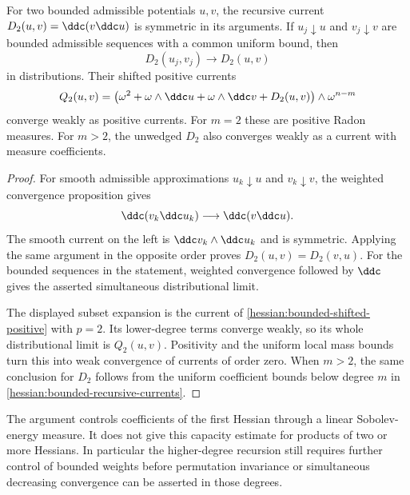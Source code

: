 \begin{theorem}\label{hessian:bounded-two-factor-convergence}
For two bounded admissible potentials $u,v$, the recursive current
$D_2(u,v)=\ddc(v\ddc u)$ is symmetric in its arguments. If
$u_j\downarrow u$ and $v_j\downarrow v$ are bounded admissible sequences
with a common uniform bound, then
\[
 D_2(u_j,v_j)\longrightarrow D_2(u,v)
\]
in distributions. Their shifted positive currents
\[
 Q_2(u,v)=\bigl(\omega^2+\omega\wedge\ddc u
           +\omega\wedge\ddc v+D_2(u,v)\bigr)\wedge\omega^{n-m}
\]
converge weakly as positive currents. For $m=2$ these are positive Radon
measures. For $m>2$, the unwedged $D_2$ also converges weakly as a
current with measure coefficients.
\end{theorem}
\begin{proof}
For smooth admissible approximations $u_k\downarrow u$ and
$v_k\downarrow v$, the weighted convergence proposition gives
\[
 \ddc(v_k\ddc u_k)\longrightarrow\ddc(v\ddc u).
\]
The smooth current on the left is $\ddc v_k\wedge\ddc u_k$ and is
symmetric. Applying the same argument in the opposite order proves
$D_2(u,v)=D_2(v,u)$. For the bounded sequences in the statement,
weighted convergence followed by $\ddc$ gives the asserted
simultaneous distributional limit.

The displayed subset expansion is the current of
\cref{hessian:bounded-shifted-positive} with $p=2$. Its lower-degree
terms converge weakly, so its whole distributional limit is $Q_2(u,v)$.
Positivity and the uniform local mass bounds turn this into weak
convergence of currents of order zero. When $m>2$, the same conclusion
for $D_2$ follows from the uniform coefficient bounds below degree $m$
in \cref{hessian:bounded-recursive-currents}.
\end{proof}

The argument controls coefficients of the first Hessian through a
linear Sobolev-energy measure. It does not give this capacity estimate
for products of two or more Hessians. In particular the higher-degree
recursion still requires further control of bounded weights before
permutation invariance or simultaneous decreasing convergence can be
asserted in those degrees.
